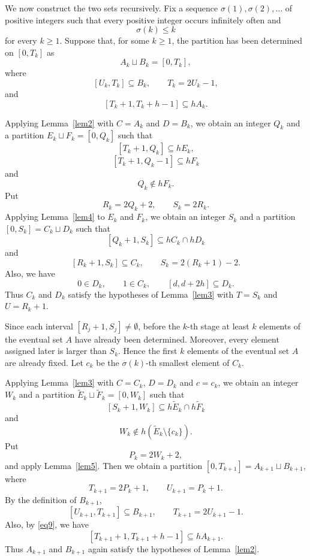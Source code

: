 \documentclass[reqno,12pt,twoside]{article}
\numberwithin{equation}{section}
\begin{document}
We now construct the two sets recursively. Fix a sequence $\sigma(1),\sigma(2),\ldots$ of positive integers such that every positive integer occurs infinitely often and
\[
 \sigma(k)\le k
\]
for every $k\ge1$. Suppose that, for some $k\ge1$, the partition has been determined on $[0,T_k]$ as
\[
 A_k\sqcup B_k=[0,T_k],
\]
where
\[
 [U_k,T_k]\subseteq B_k,\qquad T_k=2U_k-1,
\]
and
\[
 [T_k+1,T_k+h-1]\subseteq hA_k.
\]

Applying Lemma~\ref{lem2} with $C=A_k$ and $D=B_k$, we obtain an integer $Q_k$ and a partition $E_k\sqcup F_k=[0,Q_k]$ such that
\[
 [T_k+1,Q_k]\subseteq hE_k,
\]
\[
 [T_k+1,Q_k-1]\subseteq hF_k
\]
and
\[
 Q_k\notin hF_k.
\]
Put
\[
 R_k=2Q_k+2,\qquad S_k=2R_k.
\]
Applying Lemma~\ref{lem4} to $E_k$ and $F_k$, we obtain an integer $S_k$ and a partition $[0,S_k]=C_k\sqcup D_k$ such that
\[
 [Q_k+1,S_k]\subseteq hC_k\cap hD_k
\]
and
\[
 [R_k+1,S_k]\subseteq C_k,\qquad S_k=2(R_k+1)-2.
\]
Also, we have
\[
 0\in D_k,\qquad 1\in C_k,\qquad [d,d+2h]\subseteq D_k.
\]
Thus $C_k$ and $D_k$ satisfy the hypotheses of Lemma~\ref{lem3} with $T=S_k$ and $U=R_k+1$.

Since each interval $[R_j+1,S_j]\neq\emptyset$, before the $k$-th stage at least $k$ elements of the eventual set $A$ have already been determined. Moreover, every element assigned later is larger than $S_k$. Hence the first $k$ elements of the eventual set $A$ are already fixed. Let $c_k$ be the $\sigma(k)$-th smallest element of $C_k$.

Applying Lemma~\ref{lem3} with $C=C_k$, $D=D_k$ and $c=c_k$, we obtain an integer $W_k$ and a partition $\widetilde E_k\sqcup\widetilde F_k=[0,W_k]$ such that
\[
 [S_k+1,W_k]\subseteq h\widetilde E_k\cap h\widetilde F_k
\]
and
\[
 W_k\notin h(\widetilde E_k\setminus\{c_k\}).
\]
Put
\[
 P_k=2W_k+2,
\]
and apply Lemma~\ref{lem5}. Then we obtain a partition $[0,T_{k+1}]=A_{k+1}\sqcup B_{k+1}$, where
\[
 T_{k+1}=2P_k+1,\qquad U_{k+1}=P_k+1.
\]
By the definition of $B_{k+1}$,
\[
 [U_{k+1},T_{k+1}]\subseteq B_{k+1},\qquad T_{k+1}=2U_{k+1}-1.
\]
Also, by \eqref{eq9}, we have
\[
 [T_{k+1}+1,T_{k+1}+h-1]\subseteq hA_{k+1}.
\]
Thus $A_{k+1}$ and $B_{k+1}$ again satisfy the hypotheses of Lemma~\ref{lem2}. 
\end{document}
